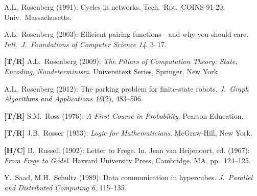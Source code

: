 \begin{thebibliography}{999}

A.L.~Rosenberg (1991): Cycles in networks.  Tech.~Rpt.~COINS-91-20, Univ.~Massachusetts.


A.L.~Rosenberg (2003): Efficient pairing functions---and why you should care.  {\it Intl.~J.~Foundations of Computer Science 14}, 3--17.

{\bf [T/R]}
A.L.~Rosenberg (2009):
{\it The Pillars of Computation Theory: State, Encoding, Nondeterminism}.
Universitext Series, Springer, New York 

A.L.~Rosenberg (2012): The parking problem for finite-state robots.  {\it J.~Graph Algorithms and Applications 16}(2), 483--506.




{\bf [T/R]}
S.M.~Ross (1976): {\it A First Course in Probability}.  Pearson Education.

{\bf [T/R]}
J.B.~Rosser (1953): {\it Logic for Mathematicians}. McGraw-Hill, New York.

{\bf [H/C]}
B.~Russell (1902): Letter to Frege.  In, Jean van Heijenoort, ed. (1967):  {\it From Frege to G\"{o}del}.  Harvard University Press, Cambridge, MA, pp.~124--125.


Y.~Saad, M.H.~Schultz (1989): Data communication in hypercubes.  {\it J.~Parallel and Distributed Computing 6}, 115--135.



\end{thebibliography}
